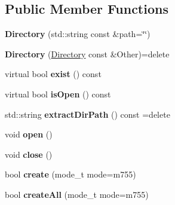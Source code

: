 \subsection*{Public Member Functions}
\begin{DoxyCompactItemize}
\item 
\hypertarget{classstb_1_1Directory_a56cbdb6e61de5a4bb9f5e283f6b6fe5b}{{\bfseries Directory} (std\+::string const \&path=\char`\"{}\char`\"{})}\label{classstb_1_1Directory_a56cbdb6e61de5a4bb9f5e283f6b6fe5b}

\item 
\hypertarget{classstb_1_1Directory_a89eabeaf6dbd619a11f9c485ffc29a6c}{{\bfseries Directory} (\hyperlink{classstb_1_1Directory}{Directory} const \&Other)=delete}\label{classstb_1_1Directory_a89eabeaf6dbd619a11f9c485ffc29a6c}

\item 
\hypertarget{classstb_1_1Directory_a3ff42a34abfee49eb0d0be68372c46a7}{virtual bool {\bfseries exist} () const }\label{classstb_1_1Directory_a3ff42a34abfee49eb0d0be68372c46a7}

\item 
\hypertarget{classstb_1_1Directory_ade033436ea912154f8d133dc008031c3}{virtual bool {\bfseries is\+Open} () const }\label{classstb_1_1Directory_ade033436ea912154f8d133dc008031c3}

\item 
\hypertarget{classstb_1_1Directory_a6968402f9dd89ee64312a873ed1a670d}{std\+::string {\bfseries extract\+Dir\+Path} () const =delete}\label{classstb_1_1Directory_a6968402f9dd89ee64312a873ed1a670d}

\item 
\hypertarget{classstb_1_1Directory_aa73a90671a6f2846a55b705527cefd1b}{void {\bfseries open} ()}\label{classstb_1_1Directory_aa73a90671a6f2846a55b705527cefd1b}

\item 
\hypertarget{classstb_1_1Directory_a1be9909018fd606328960f8b085e67be}{void {\bfseries close} ()}\label{classstb_1_1Directory_a1be9909018fd606328960f8b085e67be}

\item 
\hypertarget{classstb_1_1Directory_afc6530633ac28c837cd9a71c4aab58c4}{bool {\bfseries create} (mode\+\_\+t mode=m755)}\label{classstb_1_1Directory_afc6530633ac28c837cd9a71c4aab58c4}

\item 
\hypertarget{classstb_1_1Directory_a7e3d55f7fc8533d5f6409bf1307410eb}{bool {\bfseries create\+All} (mode\+\_\+t mode=m755)}\label{classstb_1_1Directory_a7e3d55f7fc8533d5f6409bf1307410eb}


\end{DoxyCompactItemize}
